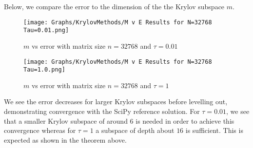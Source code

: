Below, we compare the error to the dimension of the the Krylov subspace $m$.
\begin{figure}[H]
    \centering
    \begin{minipage}{0.49\textwidth}
        \texttt{[image: Graphs/KrylovMethods/M v E Results for N=32768 Tau=0.01.png]} %
        \caption{$m$ vs error with matrix size $n=32768$ and $\tau = 0.01$}
        \label{fig:mEKrylov1}
    \end{minipage}\hfill
    \centering
    \begin{minipage}{0.49\textwidth}
        \texttt{[image: Graphs/KrylovMethods/M v E Results for N=32768 Tau=1.0.png]} %
        \caption{$m$ vs error with matrix size $n=32768$ and $\tau = 1$}
        \label{fig:mEKrylov2}
    \end{minipage}\hfill
\end{figure}
We see the error decreases for larger Krylov subspaces before levelling out, demonstrating convergence with the SciPy reference solution.
For $\tau = 0.01$, we see that a smaller Krylov subspace of around $6$ is needed in order to achieve this convergence whereas for $\tau = 1$ a subspace of depth about $16$ is sufficient.
This is expected as shown in the theorem above.


